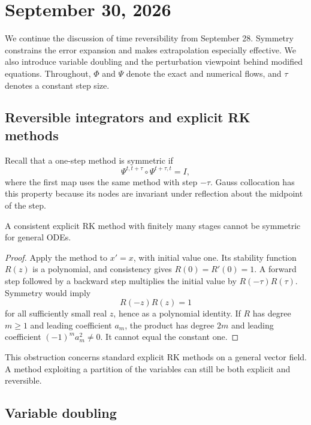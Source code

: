 \section{September 30, 2026}

We continue the discussion of time reversibility from September 28.
Symmetry constrains the error expansion and makes extrapolation
especially effective. We also introduce variable doubling and the
perturbation viewpoint behind modified equations.
Throughout, \(\Phi\) and \(\Psi\) denote the exact and numerical
flows, and \(\tau\) denotes a constant step size.

\subsection{Reversible integrators and explicit RK methods}

Recall that a one-step method is symmetric if
\[
 \Psi^{t,t+\tau}\circ\Psi^{t+\tau,t}=I,
\]
where the first map uses the same method with step \(-\tau\).
Gauss collocation has this property because its nodes are invariant
under reflection about the midpoint of the step.

\begin{proposition}
 A consistent explicit RK method with finitely many stages cannot
 be symmetric for general ODEs.
\end{proposition}

\begin{proof}
 Apply the method to \(x'=x\), with initial value one. Its stability
 function \(R(z)\) is a polynomial, and consistency gives
 \(R(0)=R'(0)=1\). A forward step followed by a backward step
 multiplies the initial value by \(R(-\tau)R(\tau)\).
 Symmetry would imply
 \[
  R(-z)R(z)=1
 \]
 for all sufficiently small real \(z\), hence as a polynomial
 identity. If \(R\) has degree \(m\geq1\) and leading coefficient
 \(a_m\), the product has degree \(2m\) and leading coefficient
 \((-1)^m a_m^2\neq0\). It cannot equal the constant one.
\end{proof}

This obstruction concerns standard explicit RK methods on a general
vector field. A method exploiting a partition of the variables can
still be both explicit and reversible.

\subsection{Variable doubling}


